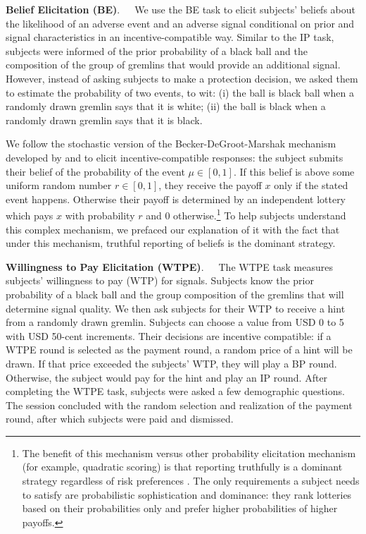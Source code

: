 \documentclass[12pt,a4paper]{article}
\begin{document}
\bigskip
\noindent\textbf{Belief Elicitation (BE)}.\ \ \ We use the BE task to elicit subjects’ beliefs about the likelihood of an adverse event and an adverse signal conditional on prior and signal characteristics in an incentive-compatible way. Similar to the IP task, subjects were informed of the prior probability of a black ball and the composition of the group of gremlins that would provide an additional signal. However, instead of asking subjects to make a protection decision, we asked them to estimate the probability of two events, to wit: (i) the ball is black ball when a randomly drawn gremlin says that it is white; (ii) the ball is black when a randomly drawn gremlin says that it is black.   

We follow the stochastic version of the Becker-DeGroot-Marshak mechanism developed by \citet{grether_testing_1992} and \citet{holt_update_2009} to elicit incentive-compatible responses: the subject submits their belief of the probability of the event $\mu \in [0,1]$. If this belief is above some uniform random number $r\in[0,1]$, they receive the payoff $x$ only if the stated event happens. Otherwise their payoff is determined by an independent lottery which pays $x$ with probability $r$ and 0 otherwise.\footnote{The benefit of this mechanism versus other probability elicitation mechanism (for example, quadratic scoring) is that reporting truthfully is a dominant strategy regardless of risk preferences \citep{karni_mechanism_2009-1}. The only requirements a subject needs to satisfy are probabilistic sophistication and dominance: they rank lotteries based on their probabilities only and prefer higher probabilities of higher payoffs.} To help subjects understand this complex mechanism, we prefaced our explanation of it with the fact that under this mechanism, truthful reporting of beliefs is the dominant strategy.

\bigskip
\noindent\textbf{Willingness to Pay Elicitation (WTPE)}.\ \ \ The WTPE task measures subjects' willingness to pay (WTP) for signals. Subjects know the prior probability of a black ball and the group composition of the gremlins that will determine signal quality.  We then ask subjects for their WTP to receive a hint from a randomly drawn gremlin. Subjects can choose a value from USD 0 to 5 with USD 50-cent increments. Their decisions are incentive compatible: if a WTPE round is selected as the payment round, a random price of a hint will be drawn. If that price exceeded the subjects’ WTP, they will play a BP round. Otherwise, the subject would pay for the hint and play an IP round.  After completing the WTPE task, subjects were asked a few demographic questions. The session concluded with the random selection and realization of the payment round, after which subjects were paid and dismissed.
\end{document}
